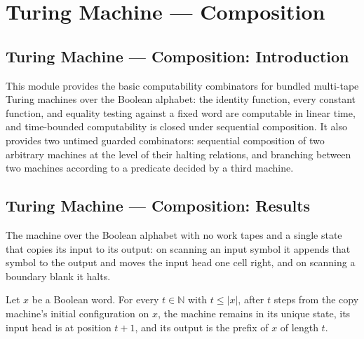 \section{Turing Machine --- Composition}
\subsection*{Turing Machine --- Composition: Introduction}

This module provides the basic computability combinators for bundled multi-tape
Turing machines over the Boolean alphabet: the identity function, every constant
function, and equality testing against a fixed word are computable in linear
time, and time-bounded computability is closed under sequential composition.
It also provides two untimed guarded combinators: sequential composition of two
arbitrary machines at the level of their halting relations, and branching
between two machines according to a predicate decided by a third machine.

\subsection*{Turing Machine --- Composition: Results}

\begin{definition}
\label{Turing.FinTM.idTM}
\leanok
{}
The machine over the Boolean alphabet with no work tapes and a single state
that copies its input to its output: on scanning an input symbol it appends
that symbol to the output and moves the input head one cell right, and on
scanning a boundary blank it halts.
\end{definition}

\begin{lemma}
\label{Turing.FinTM.idTM_run}
\leanok
{}
Let $x$ be a Boolean word. For every $t\in\mathbb{N}$ with $t\le |x|$, after $t$ steps
from the copy machine's initial configuration on $x$, the machine remains in its unique
state, its input head is at position $t+1$, and its output is the prefix of $x$ of
length $t$.
\end{lemma}

